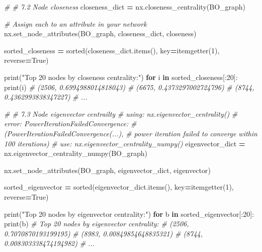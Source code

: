 \documentclass[
]{article}
\newenvironment{Shaded}{\begin{snugshade}}{\end{snugshade}}
\newcommand{\BuiltInTok}[1]{#1}
\newcommand{\CommentTok}[1]{\textcolor[rgb]{0.56,0.35,0.01}{\textit{#1}}}
\newcommand{\ControlFlowTok}[1]{\textcolor[rgb]{0.13,0.29,0.53}{\textbf{#1}}}
\newcommand{\DecValTok}[1]{\textcolor[rgb]{0.00,0.00,0.81}{#1}}
\newcommand{\KeywordTok}[1]{\textcolor[rgb]{0.13,0.29,0.53}{\textbf{#1}}}
\newcommand{\NormalTok}[1]{#1}
\newcommand{\OperatorTok}[1]{\textcolor[rgb]{0.81,0.36,0.00}{\textbf{#1}}}
\newcommand{\StringTok}[1]{\textcolor[rgb]{0.31,0.60,0.02}{#1}}
\newcommand{\VariableTok}[1]{\textcolor[rgb]{0.00,0.00,0.00}{#1}}
\begin{document}
\begin{Shaded}
\begin{Highlighting}[]
\CommentTok{\# \# 7.2 Node closeness}
\NormalTok{closeness\_dict }\OperatorTok{=}\NormalTok{ nx.closeness\_centrality(BO\_graph)}

\CommentTok{\# Assign each to an attribute in your network}
\NormalTok{nx.set\_node\_attributes(BO\_graph, closeness\_dict, }\StringTok{\textquotesingle{}closeness\textquotesingle{}}\NormalTok{)}

\NormalTok{sorted\_closeness }\OperatorTok{=} \BuiltInTok{sorted}\NormalTok{(closeness\_dict.items(), }
\NormalTok{  key}\OperatorTok{=}\NormalTok{itemgetter(}\DecValTok{1}\NormalTok{), }
\NormalTok{  reverse}\OperatorTok{=}\VariableTok{True}\NormalTok{)}

\BuiltInTok{print}\NormalTok{(}\StringTok{"Top 20 nodes by closeness centrality:"}\NormalTok{)}
\ControlFlowTok{for}\NormalTok{ i }\KeywordTok{in}\NormalTok{ sorted\_closeness[:}\DecValTok{20}\NormalTok{]:}
    \BuiltInTok{print}\NormalTok{(i)}
\CommentTok{\# (\textquotesingle{}2506\textquotesingle{}, 0.6994988014818043)}
\CommentTok{\# (\textquotesingle{}6675\textquotesingle{}, 0.4373297002724796)}
\CommentTok{\# (\textquotesingle{}8744\textquotesingle{}, 0.4362993838347227)}
\CommentTok{\# ...}

\CommentTok{\# \# 7.3 Node eigenvector centrailty}
\CommentTok{\# using: nx.eigenvector\_centrality()}
\CommentTok{\# error: PowerIterationFailedConvergence: }
\CommentTok{\# (PowerIterationFailedConvergence(...), }
\CommentTok{\# \textquotesingle{}power iteration failed to converge within 100 iterations\textquotesingle{})}
\CommentTok{\# use: nx.eigenvector\_centrality\_numpy()}
\NormalTok{eigenvector\_dict }\OperatorTok{=}\NormalTok{ nx.eigenvector\_centrality\_numpy(BO\_graph)}

\NormalTok{nx.set\_node\_attributes(BO\_graph, eigenvector\_dict, }\StringTok{\textquotesingle{}eigenvector\textquotesingle{}}\NormalTok{)}

\NormalTok{sorted\_eigenvector }\OperatorTok{=} \BuiltInTok{sorted}\NormalTok{(eigenvector\_dict.items(), }
\NormalTok{  key}\OperatorTok{=}\NormalTok{itemgetter(}\DecValTok{1}\NormalTok{), }
\NormalTok{  reverse}\OperatorTok{=}\VariableTok{True}\NormalTok{)}

\BuiltInTok{print}\NormalTok{(}\StringTok{"Top 20 nodes by eigenvector centrality:"}\NormalTok{)}
\ControlFlowTok{for}\NormalTok{ b }\KeywordTok{in}\NormalTok{ sorted\_eigenvector[:}\DecValTok{20}\NormalTok{]:}
    \BuiltInTok{print}\NormalTok{(b)}
\CommentTok{\# Top 20 nodes by eigenvector centrality:}
\CommentTok{\# (\textquotesingle{}2506\textquotesingle{}, 0.7070870193199195)}
\CommentTok{\# (\textquotesingle{}8983\textquotesingle{}, 0.00849854648835321)}
\CommentTok{\# (\textquotesingle{}8744\textquotesingle{}, 0.008303338474194982)}
\CommentTok{\# ...}
\end{Highlighting}
\end{Shaded}
\end{document}
